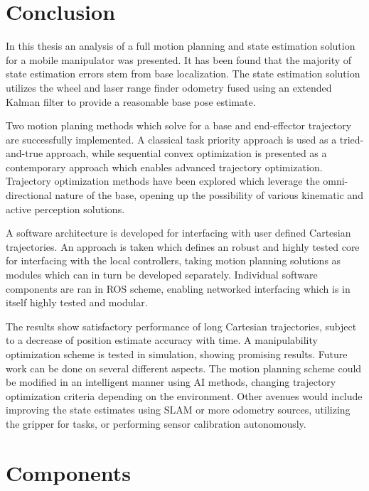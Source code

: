 \documentclass[times, utf8, diplomski, english]{fer}
\begin{document}
\chapter{Conclusion}
In this thesis an analysis of a full motion planning and state estimation solution for a mobile manipulator was presented.
It has been found that the majority of state estimation errors stem from base localization.
The state estimation solution utilizes the wheel and laser range finder odometry fused using an extended Kalman filter to provide a reasonable base pose estimate. 

Two motion planing methods which solve for a base and end-effector trajectory are successfully implemented.
A classical task priority approach is used as a tried-and-true approach, while sequential convex optimization is presented as a contemporary approach which enables advanced trajectory optimization.
Trajectory optimization methods have been explored which leverage the omni-directional nature of the base, opening up the possibility of various kinematic and active perception solutions.

A software architecture is developed for interfacing with user defined Cartesian trajectories.
An approach is taken which defines an robust and highly tested core for interfacing with the local controllers, taking motion planning solutions as modules which can in turn be developed separately.
Individual software components are ran in ROS scheme, enabling networked interfacing which is in itself highly tested and modular.

The results show satisfactory performance of long Cartesian trajectories, subject to a decrease of position estimate accuracy with time.
A manipulability optimization scheme is tested in simulation, showing promising results.
Future work can be done on several different aspects.
The motion planning scheme could be modified in an intelligent manner using AI methods, changing trajectory optimization criteria depending on the environment.
Other avenues would include improving the state estimates using SLAM or more odometry sources, utilizing the gripper for tasks, or performing sensor calibration autonomously.





\appendix
\chapter{Components}\label{appA}
\end{document}
